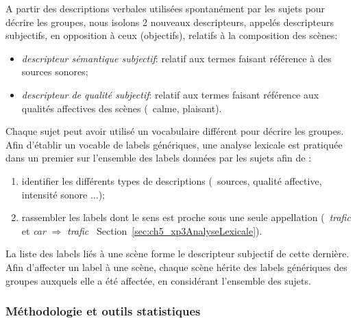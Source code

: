 A partir des descriptions verbales utilisées spontanément par les sujets pour décrire les groupes, nous isolons 2 nouveaux descripteurs, appelés descripteurs subjectifs, en opposition à ceux (objectifs), relatifs à la composition des scènes:

\begin{itemize}
\item \emph{descripteur sémantique subjectif}: relatif aux termes faisant référence à des sources sonores;
\item \emph{descripteur de qualité subjectif}: relatif aux termes faisant référence aux qualités affectives des scènes (\eg~calme, plaisant).
\end{itemize}

Chaque sujet peut avoir utilisé un vocabulaire différent pour décrire les groupes. Afin d'établir un vocable de labels génériques, une analyse lexicale est pratiquée dans un premier sur l'ensemble des labels données par les sujets afin de :

\begin{enumerate}
\item identifier les différents types de descriptions (\eg~sources, qualité affective, intensité sonore $\ldots$);
\item rassembler les labels dont le sens est proche sous une seule appellation (\eg~\emph{trafic} et \emph{car} $\Longrightarrow$ \emph{trafic} \cf~Section~\ref{sec:ch5_xp3AnalyseLexicale}).
\end{enumerate}

La liste des labels liés à une scène forme le descripteur subjectif de cette dernière. Afin d'affecter un label à une scène, chaque scène hérite des labels génériques des groupes auxquels elle a été affectée, en considérant l'ensemble des sujets. 

\subsubsection{Méthodologie et outils statistiques}


